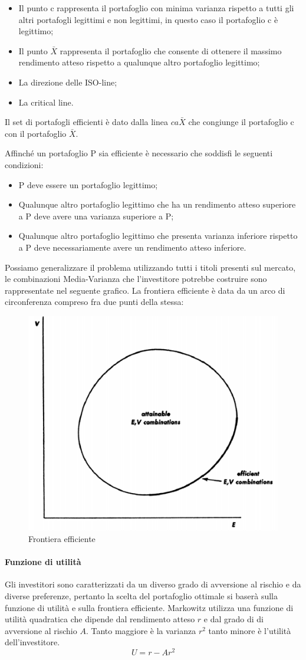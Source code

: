 \begin{itemize}
	\item Il punto c rappresenta il portafoglio con minima varianza rispetto a tutti gli altri portafogli legittimi e non legittimi, in questo caso il portafoglio c è legittimo;
	\item Il punto $\bar{X}$ rappresenta il portafoglio che consente di ottenere il massimo rendimento atteso rispetto a qualunque altro portafoglio legittimo;
	\item La direzione delle ISO-line;
	\item La critical line.
\end{itemize}

Il set di portafogli efficienti è dato dalla linea $ca\bar{X}$ che congiunge il portafoglio c con il portafoglio $\bar{X}$. 

Affinché un portafoglio P sia efficiente è necessario che soddisfi le seguenti condizioni: 
\begin{itemize}
	\item P deve essere un portafoglio legittimo;
	\item Qualunque altro portafoglio legittimo che ha un rendimento atteso superiore a P deve avere una varianza superiore a P;
	\item Qualunque altro portafoglio legittimo che presenta varianza inferiore rispetto a P deve necessariamente avere un rendimento atteso inferiore. 
\end{itemize}
Possiamo generalizzare il problema utilizzando tutti i titoli presenti sul mercato, le combinazioni Media-Varianza che l'investitore potrebbe costruire sono rappresentate nel seguente grafico. La frontiera efficiente è data da un arco di circonferenza compreso fra due punti della stessa:
\newpage
\begin{figure} [h!]
	\centering
	\includegraphics[width=0.4\linewidth]{"imgs/efficient combination"}
	\caption{Frontiera efficiente}
	\label{fig:efficient-combination}
\end{figure}
\paragraph{Funzione di utilità}
Gli investitori sono caratterizzati da un diverso grado di avversione al rischio e da diverse preferenze, pertanto la scelta del portafoglio ottimale si baserà sulla funzione di utilità e sulla frontiera efficiente. Markowitz utilizza una funzione di utilità quadratica che dipende dal rendimento atteso $r$ e dal grado di di avversione al rischio $A$. Tanto maggiore è la varianza $r^2$ tanto minore è l'utilità dell'investitore.
\begin{equation}
U= r-Ar^2
\end{equation}

